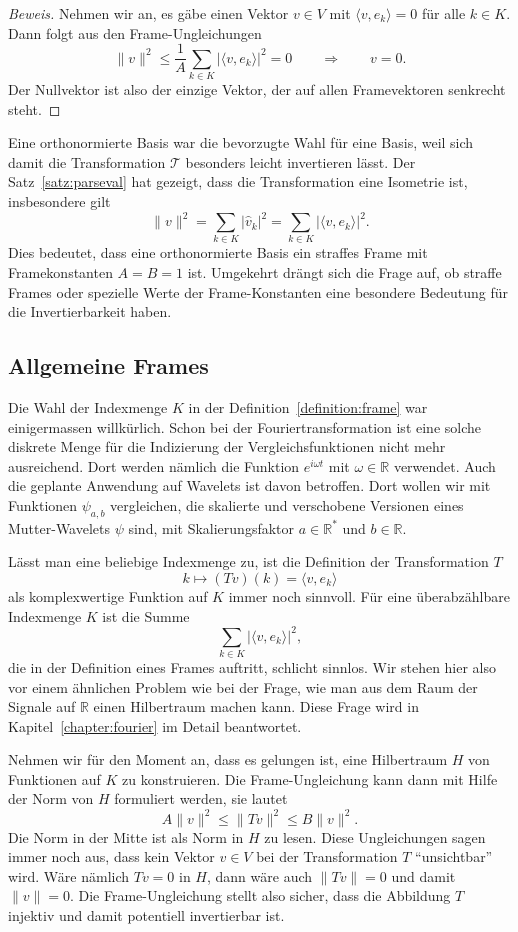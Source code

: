 \begin{proof}[Beweis]
Nehmen wir an, es gäbe einen Vektor $v\in V$ mit $\langle v,e_k\rangle=0$
für alle $k\in K$.
Dann folgt aus den Frame-Ungleichungen
\[
\| v \|^2 \le \frac1{A} \sum_{k\in K} |\langle v,e_k\rangle|^2 = 0
\qquad\Rightarrow\qquad
v=0.
\]
Der Nullvektor ist also der einzige Vektor, der auf allen Framevektoren
senkrecht steht.
\end{proof}

Eine orthonormierte Basis war die bevorzugte Wahl für eine Basis, weil
sich damit die Transformation $\mathcal{T}$ besonders leicht invertieren
lässt.
Der Satz~\ref{satz:parseval} hat gezeigt, dass die Transformation %
eine Isometrie ist, insbesondere gilt
\[
\|v\|^2
=
\sum_{k\in K} |\hat{v}_k|^2
=
\sum_{k\in K} |\langle v,e_k\rangle|^2.
\]
Dies bedeutet, dass eine orthonormierte Basis ein straffes Frame mit
Framekonstanten $A=B=1$ ist.
Umgekehrt drängt sich die Frage auf, ob straffe Frames oder spezielle
Werte der Frame-Konstanten eine besondere Bedeutung für die Invertierbarkeit
haben.

\subsection{Allgemeine Frames}
Die Wahl der Indexmenge $K$ in der Definition~\ref{definition:frame}
war einigermassen willkürlich.
Schon bei der Fouriertransformation ist eine solche diskrete Menge
für die Indizierung der Vergleichsfunktionen nicht mehr ausreichend.
Dort werden nämlich die Funktion $e^{i\omega t}$ mit $\omega\in\mathbb R$
verwendet.
Auch die geplante Anwendung auf Wavelets ist davon betroffen.
Dort wollen wir mit Funktionen $\psi_{a,b}$ vergleichen, die 
skalierte und verschobene Versionen eines Mutter-Wavelets $\psi$ sind,
mit Skalierungsfaktor $a\in\mathbb R^*$ und $b\in \mathbb R$.

Lässt man eine beliebige Indexmenge zu, ist die Definition der
Transformation $T$
\[
k
\mapsto
(Tv)(k) = \langle v,e_k\rangle
\]
als komplexwertige Funktion auf $K$ immer noch sinnvoll.
Für eine überabzählbare Indexmenge $K$ ist die Summe 
\[
\sum_{k\in K} |\langle v,e_k\rangle|^2,
\]
die in der Definition eines Frames auftritt, schlicht sinnlos.
Wir stehen hier also vor einem ähnlichen Problem wie bei der Frage,
wie man aus dem Raum der Signale auf $\mathbb R$ einen Hilbertraum machen kann.
Diese Frage wird in Kapitel~\ref{chapter:fourier} im Detail beantwortet.

Nehmen wir für den Moment an, dass es gelungen ist, eine Hilbertraum $H$
von Funktionen auf $K$ zu konstruieren.
Die Frame-Ungleichung kann dann mit Hilfe der Norm von $H$ formuliert
werden, sie lautet
\[
A\|v\|^2 \le \|Tv\|^2 \le B\|v\|^2.
\]
Die Norm in der Mitte ist als Norm in $H$ zu lesen.
Diese Ungleichungen sagen immer noch aus, dass kein Vektor $v\in V$ bei
der Transformation $T$ ``unsichtbar'' wird.
Wäre nämlich $Tv=0$ in $H$, dann wäre auch $\|Tv\|=0$ und damit
$\|v\|=0$.
Die Frame-Ungleichung stellt also sicher, dass die Abbildung $T$ 
injektiv und damit potentiell invertierbar ist.

